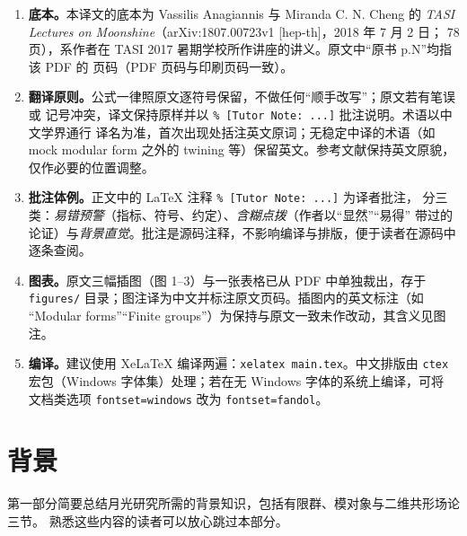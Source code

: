 \documentclass[11pt,a4paper,fontset=windows]{ctexart}
\begin{document}
\begin{enumerate}[label=\arabic*.,leftmargin=2.2em,itemsep=3pt]
\item \textbf{底本。}本译文的底本为 Vassilis Anagiannis 与 Miranda C. N. Cheng 的
      \emph{TASI Lectures on Moonshine}（arXiv:1807.00723v1 [hep-th]，2018 年 7 月 2 日；
      78 页），系作者在 TASI 2017 暑期学校所作讲座的讲义。原文中“原书 p.N”均指该 PDF 的
      页码（PDF 页码与印刷页码一致）。

\item \textbf{翻译原则。}公式一律照原文逐符号保留，不做任何“顺手改写”；原文若有笔误或
      记号冲突，译文保持原样并以 \verb|% [Tutor Note: ...]| 批注说明。术语以中文学界通行
      译名为准，首次出现处括注英文原词；无稳定中译的术语（如 mock modular form 之外的
      twining 等）保留英文。参考文献保持英文原貌，仅作必要的位置调整。

\item \textbf{批注体例。}正文中的 LaTeX 注释 \verb|% [Tutor Note: ...]| 为译者批注，
      分三类：\emph{易错预警}（指标、符号、约定）、\emph{含糊点拨}（作者以“显然”“易得”
      带过的论证）与\emph{背景直觉}。批注是源码注释，不影响编译与排版，便于读者在源码中
      逐条查阅。

\item \textbf{图表。}原文三幅插图（图 1--3）与一张表格已从 PDF 中单独裁出，存于
      \verb|figures/| 目录；图注译为中文并标注原文页码。插图内的英文标注（如
      “Modular forms”“Finite groups”）为保持与原文一致未作改动，其含义见图注。

\item \textbf{编译。}建议使用 XeLaTeX 编译两遍：\verb|xelatex main.tex|。中文排版由
      \texttt{ctex} 宏包（Windows 字体集）处理；若在无 Windows 字体的系统上编译，可将
      文档类选项 \verb|fontset=windows| 改为 \verb|fontset=fandol|。
\end{enumerate}

\newpage

\tableofcontents
\newpage



\part{背景}
第一部分简要总结月光研究所需的背景知识，包括有限群、模对象与二维共形场论三节。
熟悉这些内容的读者可以放心跳过本部分。




\end{document}
